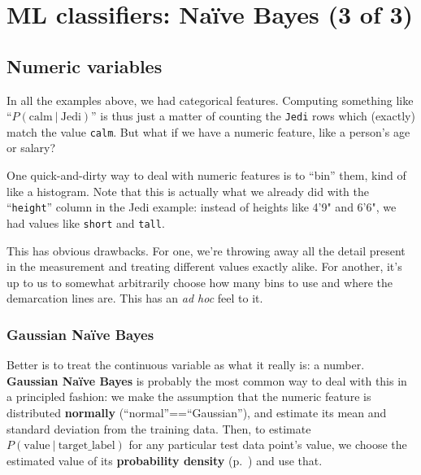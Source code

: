 
\chapter[Na\"{i}ve Bayes (3 of 3)]
{\LARGE ML classifiers: Na\"{i}ve Bayes (3 of 3)}
\label{ch:naiveBayes3}

\section{Numeric variables}


In all the examples above, we had categorical features. Computing something
like ``$P(\textrm{calm}\ |\ \textrm{Jedi})$'' is thus just a matter of counting
the \texttt{Jedi} rows which (exactly) match the value \texttt{calm}. But what
if we have a numeric feature, like a person's age or salary?

One quick-and-dirty way to deal with numeric features is to ``bin'' them, kind
of like a histogram. Note that this is actually what we already did with the
``\texttt{height}'' column in the Jedi example: instead of heights like 4'9"
and 6'6", we had values like \texttt{short} and \texttt{tall}.

This has obvious drawbacks. For one, we're throwing away all the detail
present in the measurement and treating different values exactly alike. For
another, it's up to us to somewhat arbitrarily choose how many bins to use and
where the demarcation lines are. This has an \textit{ad hoc} feel to it.

\subsection{Gaussian Na\"{i}ve Bayes}

Better is to treat the continuous variable as what it really is: a number.
\textbf{Gaussian Na\"{i}ve Bayes} is probably the most common way to deal with
this in a principled fashion: we make the assumption that the numeric feature
is distributed \textbf{normally} (``normal''==``Gaussian''), and estimate its
mean and standard deviation from the training data. Then, to estimate
$P(\textrm{value}\ |\ \textrm{target\_label})$ for any particular test data
point's value, we choose the estimated value of its \textbf{probability
density} (p.~\pageref{probDensity}) and use that.


